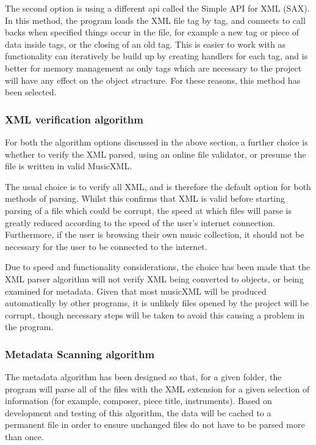 The second option is using a different api called the Simple API for XML (SAX). In this method, the program loads the XML file tag by tag, and connects to call backs when specified things occur in the file, for example a new tag or piece of data inside tags, or the closing of an old tag. This is easier to work with as functionality can iteratively be build up by creating handlers for each tag, and is better for memory management as only tags which are necessary to the project will have any effect on the object structure. For these reasons, this method has been selected.

\subsubsection{XML verification algorithm}
For both the algorithm options discussed in the above section, a further choice is whether to verify the XML parsed, using an online file validator, or presume the file is written in valid MusicXML. 

The usual choice is to verify all XML, and is therefore the default option for both methods of parsing. Whilst this confirms that XML is valid before starting parsing of a file which could be corrupt, the speed at which files will parse is greatly reduced according to the speed of the user's internet connection.
Furthermore, if the user is browsing their own music collection, it should not be necessary for the user to be connected to the internet.

Due to speed and functionality considerations, the choice has been made that the XML parser algorithm will not verify XML being converted to objects, or being examined for metadata. Given that most musicXML will be produced automatically by other programs, it is unlikely files opened by the project will be corrupt, though necessary steps will be taken to avoid this causing a problem in the program.

\subsubsection{Metadata Scanning algorithm}
The metadata algorithm has been designed so that, for a given folder, the program will parse all of the files with the XML extension for a given selection of information (for example, composer, piece title, instruments). Based on development and testing of this algorithm, the data will be cached to a permanent file in order to ensure unchanged files do not have to be parsed more than once.

